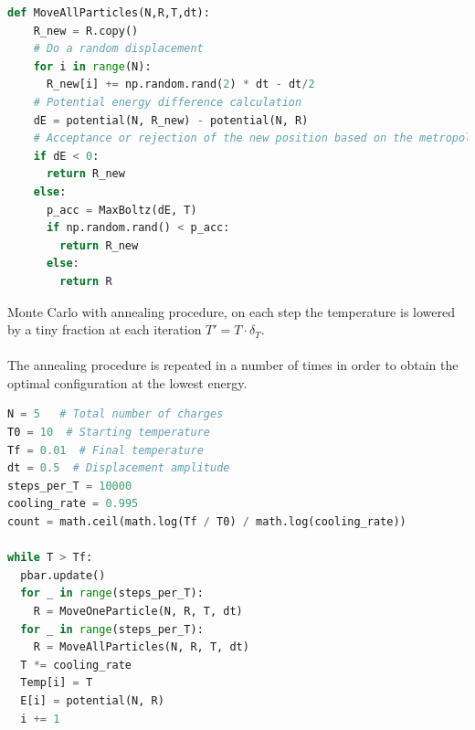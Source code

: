 \documentclass{article}
\begin{document}
\clearpage
\begin{lstlisting}[language=Python]
def MoveAllParticles(N,R,T,dt):
    R_new = R.copy()
    # Do a random displacement
    for i in range(N):
      R_new[i] += np.random.rand(2) * dt - dt/2
    # Potential energy difference calculation
    dE = potential(N, R_new) - potential(N, R)
    # Acceptance or rejection of the new position based on the metropolis algorithm
    if dE < 0:
      return R_new
    else:
      p_acc = MaxBoltz(dE, T)
      if np.random.rand() < p_acc:
        return R_new
      else:
        return R
\end{lstlisting}
Monte Carlo with annealing procedure, on each step the temperature is lowered by a tiny fraction at each iteration $T'=T\cdot\delta_T$.\\\\The annealing procedure is repeated in a number of times in order to obtain the optimal configuration at the lowest energy.
\begin{lstlisting}[language=Python]
N = 5   # Total number of charges
T0 = 10  # Starting temperature
Tf = 0.01  # Final temperature
dt = 0.5  # Displacement amplitude
steps_per_T = 10000
cooling_rate = 0.995
count = math.ceil(math.log(Tf / T0) / math.log(cooling_rate))

while T > Tf:
  pbar.update()
  for _ in range(steps_per_T):
    R = MoveOneParticle(N, R, T, dt)
  for _ in range(steps_per_T):
    R = MoveAllParticles(N, R, T, dt)
  T *= cooling_rate
  Temp[i] = T
  E[i] = potential(N, R)
  i += 1
\end{lstlisting}
\clearpage
\end{document}
